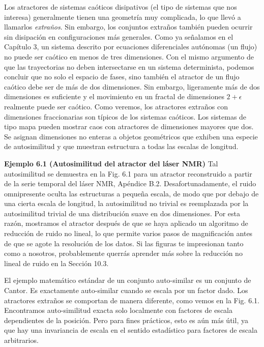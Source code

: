 \documentclass[10pt,a4paper]{book}
\begin{document}
\bigskip

Los atractores de sistemas caóticos disipativos (el tipo de sistemas que nos interesa) generalmente tienen una geometría muy complicada, lo que llevó a llamarlos \emph{extraños}. Sin embargo, los conjuntos extraños también pueden ocurrir sin disipación en configuraciones más generales. Como ya señalamos en el Capítulo 3, un sistema descrito por ecuaciones diferenciales autónomas (un flujo) no puede ser caótico en menos de tres dimensiones. Con el mismo argumento de que las trayectorias no deben intersectarse en un sistema determinista, podemos concluir que no solo el espacio de fases, sino también el atractor de un flujo caótico debe ser de más de dos dimensiones. Sin embargo, ligeramente más de dos dimensiones es suficiente y el movimiento en un fractal de dimensiones $2 + \epsilon$ realmente puede ser caótico. Como veremos, los atractores extraños con dimensiones fraccionarias son típicos de los sistemas caóticos. Los sistemas de tipo mapa pueden mostrar caos con atractores de dimensiones mayores que dos. Se asignan dimensiones no enteras a objetos geométricos que exhiben una especie de autosimilitud y que muestran estructura a todas las escalas de longitud.

\bigskip

\textbf{Ejemplo 6.1 (Autosimilitud del atractor del láser NMR)} Tal autosimilitud se demuestra en la Fig. 6.1 para un atractor reconstruido a partir de la serie temporal del láser NMR, Apéndice B.2. Desafortunadamente, el ruido omnipresente oculta las estructuras a pequeña escala, de modo que por debajo de una cierta escala de longitud, la autosimilitud no trivial es reemplazada por la autosimilitud trivial de una distribución suave en dos dimensiones. Por esta razón, mostramos el atractor después de que se haya aplicado un algoritmo de reducción de ruido no lineal, lo que permite varios pasos de magnificación antes de que se agote la resolución de los datos. Si las figuras te impresionan tanto como a nosotros, probablemente querrás aprender más sobre la reducción no lineal de ruido en la Sección 10.3.

\bigskip

El ejemplo matemático estándar de un conjunto auto-similar es un conjunto de Cantor. Es exactamente auto-similar cuando se escala por un factor dado. Los atractores extraños se comportan de manera diferente, como vemos en la Fig. 6.1. Encontramos auto-similitud exacta solo localmente con factores de escala dependientes de la posición. Pero para fines prácticos, esto es aún más útil, ya que hay una invariancia de escala en el sentido estadístico para factores de escala arbitrarios.
\end{document}
